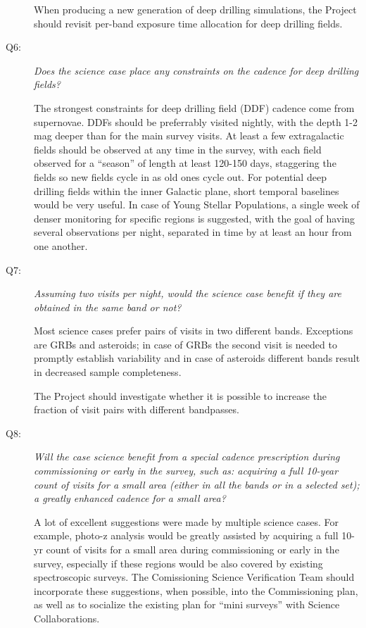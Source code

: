 \begin{description}
When producing a new generation of deep drilling simulations, the
Project should revisit per-band exposure time allocation for deep
drilling fields.


\item[Q6:] {\it Does the science case place any constraints on the
cadence for deep drilling fields?}

The strongest constraints for deep drilling field (DDF) cadence come
from supernovae. DDFs should be preferrably visited nightly, with the
depth 1-2 mag deeper than for the main survey visits. At least a few
extragalactic fields should be observed at any time in the survey, with
each field observed for a ``season'' of length at least 120-150 days,
staggering the fields so new fields cycle in as old ones cycle out. For
potential deep drilling fields within the inner Galactic plane, short
temporal baselines would be very useful. In case of Young Stellar
Populations, a single week of denser monitoring for specific regions is
suggested, with the goal of having several observations per night,
separated in time by at least an hour from one another.


\item[Q7:] {\it Assuming two visits per night, would the science case
benefit if they are obtained in the same band or not?}

Most science cases prefer pairs of visits in two different bands.
Exceptions are GRBs and asteroids; in case of GRBs the second visit is
needed to promptly establish variability and in case of asteroids
different bands result in decreased sample completeness.

The Project should investigate whether it is possible to increase the
fraction of visit pairs with different bandpasses.


\item[Q8:] {\it Will the case science benefit from a special cadence
prescription during commissioning or early in the survey, such as:
acquiring a full 10-year count of visits for a small area (either in all
the bands or in a  selected set); a greatly enhanced cadence for a small
area?}

A lot of excellent suggestions were made by multiple science cases.
For example, photo-z analysis would be greatly assisted by acquiring 
a full 10-yr count of visits for a small area during commissioning or 
early in the survey, especially if these regions would be also covered by 
existing spectroscopic surveys.
The Comissioning Science Verification Team should incorporate these
suggestions, when possible, into the Commissioning plan, as well
as to socialize the existing plan for ``mini surveys'' with Science
Collaborations.



\end{description}
